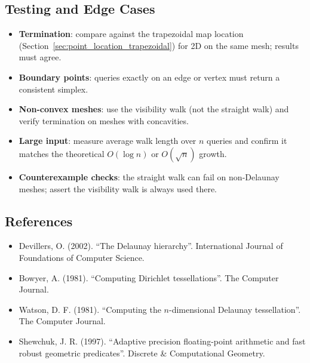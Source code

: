 \subsection{Testing and Edge Cases}
\begin{itemize}
\item \textbf{Termination}: compare against the trapezoidal map location
  (Section~\ref{sec:point_location_trapezoidal}) for 2D on the same mesh;
  results must agree.
\item \textbf{Boundary points}: queries exactly on an edge or vertex must
  return a consistent simplex.
\item \textbf{Non-convex meshes}: use the visibility walk (not the straight
  walk) and verify termination on meshes with concavities.
\item \textbf{Large input}: measure average walk length over $n$ queries and
  confirm it matches the theoretical $O(\log n)$ or $O(\sqrt{n})$ growth.
\item \textbf{Counterexample checks}: the straight walk can fail on
  non-Delaunay meshes; assert the visibility walk is always used there.
\end{itemize}

\subsection{References}
\begin{itemize}
\item Devillers, O. (2002). ``The Delaunay hierarchy''. International Journal
  of Foundations of Computer Science.
\item Bowyer, A. (1981). ``Computing Dirichlet tessellations''. The Computer
  Journal.
\item Watson, D. F. (1981). ``Computing the $n$-dimensional Delaunay
  tessellation''. The Computer Journal.
\item Shewchuk, J. R. (1997). ``Adaptive precision floating-point arithmetic
  and fast robust geometric predicates''. Discrete \& Computational Geometry.
\end{itemize}
